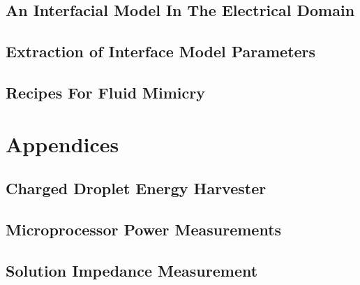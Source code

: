   \chapter{An Interfacial Model In The Electrical Domain}
    \label{chap:theInterfaceModel}
    

  \chapter{Extraction of Interface Model Parameters}
    \label{chap:modellingSaline}
    

  \chapter{Recipes For Fluid Mimicry}
    \label{chap:fluid_mimicry}
    

\part{Appendices}

  \appendix

  \chapter{Charged Droplet Energy Harvester}
    \label{appendix:chargedDropletts}
    

  \chapter{Microprocessor Power Measurements}
    

  \chapter{Solution Impedance Measurement}
    

